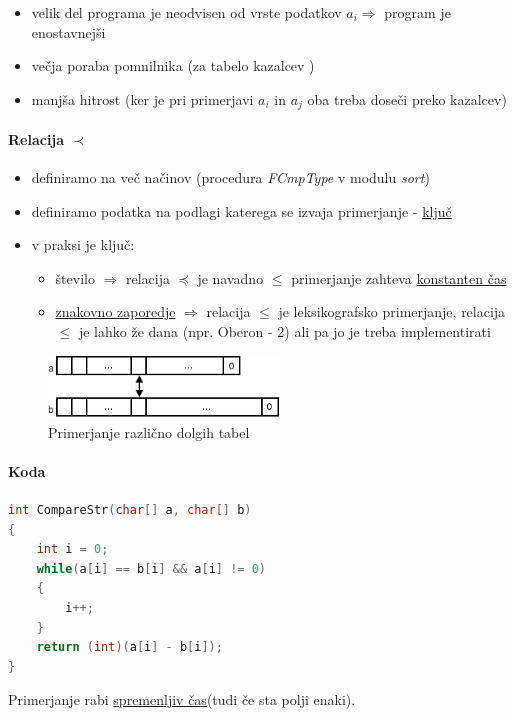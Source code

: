 \documentclass[a4paper,10pt]{article}
\begin{document}
\begin{itemize}
	\item velik del programa je neodvisen od vrste podatkov $a_i \Rightarrow$ program je enostavnej\v{s}i
	\item ve\v{c}ja poraba pomnilnika (za tabelo kazalcev )
	\item manj\v{s}a hitrost (ker je pri primerjavi $a_i$ in $a_j$ oba treba dose\v{c}i preko kazalcev)
\end{itemize}


\paragraph*{Relacija $\prec$}

\begin{itemize}
\item definiramo na ve\v{c} na\v{c}inov (procedura \emph{FCmpType} v modulu \emph{sort})
\item definiramo podatka na podlagi katerega se izvaja primerjanje - \underline{klju\v{c}}
\item v praksi je klju\v{c}:
	\begin{itemize}
	\item \v{s}tevilo $\Rightarrow$ relacija $\preceq$ je navadno $\leq$ primerjanje zahteva \underline{konstanten \v{c}as}
	\item \underline{znakovno zaporedje} $\Rightarrow$ relacija $\leq$ je leksikografsko primerjanje, relacija $\leq$ je lahko \v{z}e dana (npr. Oberon - 2) ali pa jo je treba implementirati
	\end{itemize}
\end{itemize}

\begin{figure}[hbt]
	\centering
	\includegraphics[width=6.1cm,height=1.65cm]{Slike/Primerjanje.png}
	\caption{Primerjanje razli\v cno dolgih tabel}
	\label{Primerjanje}
\end{figure} 


\paragraph{Koda}
\begin{flushleft}
\begin{lstlisting}[language=C, caption={Primer funkcije za primerjanja nizov v jeziku C}]
int CompareStr(char[] a, char[] b)
{
	int i = 0;
	while(a[i] == b[i] && a[i] != 0)
	{
		i++;
	}
	return (int)(a[i] - b[i]);
}
\end{lstlisting}
\end{flushleft}
Primerjanje rabi \underline{spremenljiv \v{c}as}(tudi \v{c}e sta polji enaki).
\end{document}

